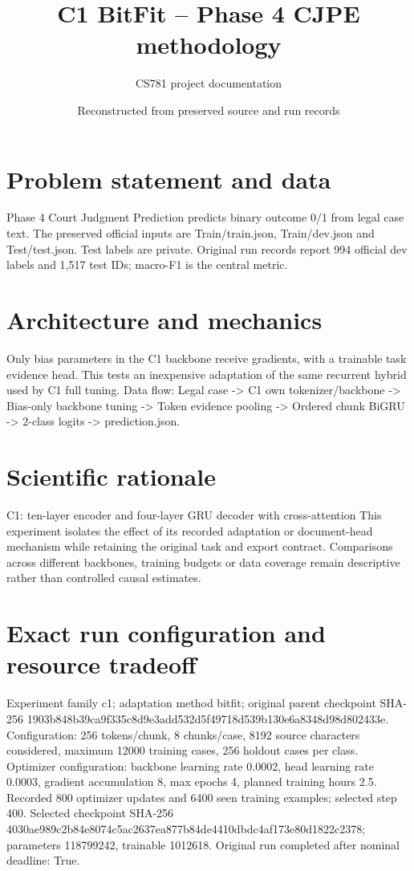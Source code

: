 \documentclass[11pt,a4paper]{article}
\begin{document}
\title{C1 BitFit -- Phase 4 CJPE methodology}
\author{CS781 project documentation}
\date{Reconstructed from preserved source and run records}
\maketitle
\section{Problem statement and data}
Phase 4 Court Judgment Prediction predicts binary outcome 0/1 from legal case text. The preserved official inputs are Train/train.json, Train/dev.json and Test/test.json. Test labels are private. Original run records report 994 official dev labels and 1,517 test IDs; macro-F1 is the central metric.
\section{Architecture and mechanics}
Only bias parameters in the C1 backbone receive gradients, with a trainable task evidence head. This tests an inexpensive adaptation of the same recurrent hybrid used by C1 full tuning. Data flow: Legal case -> C1 own tokenizer/backbone -> Bias-only backbone tuning -> Token evidence pooling -> Ordered chunk BiGRU -> 2-class logits -> prediction.json.
\section{Scientific rationale}
C1: ten-layer encoder and four-layer GRU decoder with cross-attention This experiment isolates the effect of its recorded adaptation or document-head mechanism while retaining the original task and export contract. Comparisons across different backbones, training budgets or data coverage remain descriptive rather than controlled causal estimates.
\section{Exact run configuration and resource tradeoff}
Experiment family c1; adaptation method bitfit; original parent checkpoint SHA-256 1903b848b39ca9f335c8d9e3add532d5f49718d539b130e6a8348d98d802433e. Configuration: 256 tokens/chunk, 8 chunks/case, 8192 source characters considered, maximum 12000 training cases, 256 holdout cases per class. Optimizer configuration: backbone learning rate 0.0002, head learning rate 0.0003, gradient accumulation 8, max epochs 4, planned training hours 2.5. Recorded 800 optimizer updates and 6400 seen training examples; selected step 400. Selected checkpoint SHA-256 4030ae989c2b84e8074c5ac2637ea877b84de4410dbdc4af173e80d1822c2378; parameters 118799242, trainable 1012618. Original run completed after nominal deadline: True.
\end{document}
